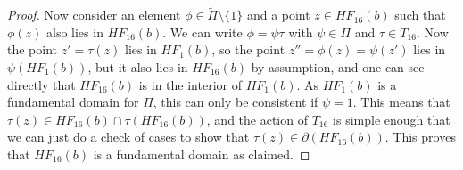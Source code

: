 \documentclass[reqno]{amsart}
\newcommand{\sm}        {\setminus}
\newcommand{\tPi}	{\widetilde{\Pi}}
\renewcommand{\:}{\colon}
\theoremstyle{definition}
\begin{document}
\begin{proof}
 Now consider an element $\phi\in\tPi\sm\{1\}$ and a point
 $z\in HF_{16}(b)$ such that $\phi(z)$ also lies in $HF_{16}(b)$.  We
 can write $\phi=\psi\tau$ with $\psi\in\Pi$ and $\tau\in T_{16}$.
 Now the point $z'=\tau(z)$ lies in $HF_1(b)$, so the point
 $z''=\phi(z)=\psi(z')$ lies in $\psi(HF_1(b))$, but it also lies in
 $HF_{16}(b)$ by assumption, and one can see directly that
 $HF_{16}(b)$ is in the interior of $HF_1(b)$.  As $HF_1(b)$ is a
 fundamental domain for $\Pi$, this can only be consistent if
 $\psi=1$.  This means that
 $\tau(z)\in HF_{16}(b)\cap\tau(HF_{16}(b))$, and the action of
 $T_{16}$ is simple enough that we can just do a check of cases to
 show that $\tau(z)\in\partial(HF_{16}(b))$.  This proves that
 $HF_{16}(b)$ is a fundamental domain as claimed.
\end{proof}
\end{document}
